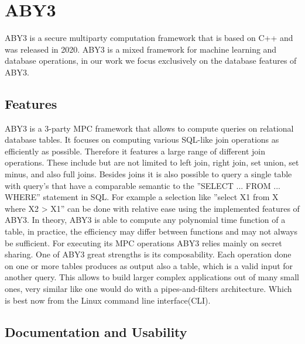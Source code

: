 \section{ABY3}
ABY3 \cite{mohassel2020fast} is a secure multiparty computation framework that is based on C++ and was released in 2020. ABY3 is a mixed framework for machine learning and database operations, in our work we focus exclusively on the database features of ABY3. 
\subsection{Features}
ABY3 is a 3-party MPC framework that allows to compute queries on relational database tables. It focuses on computing various SQL-like join operations as efficiently as possible. Therefore it features a large range of different join operations. These include but are not limited to left join, right join, set union, set minus, and also full joins.  
Besides joins it is also possible to query a single table with query's that have a comparable semantic to the ''SELECT ... FROM ... WHERE'' statement in SQL. For example a selection like ''select X1 from X  where X2 > X1'' can be done with relative ease using the implemented features of ABY3. In theory, ABY3 is able to compute any polynomial time function of a table, in practice, the efficiency may differ between functions and may not always be sufficient. For executing its MPC operations ABY3 relies mainly on secret sharing. 
One of ABY3 great strengths is its composability. 
Each operation done on one or more tables produces as output also a table, which is a valid input for another query. This allows to build larger complex applications out of many small ones, very similar like one would do with a pipes-and-filters architecture. Which is best now from the Linux command line interface(CLI). 

\subsection{Documentation and Usability}
